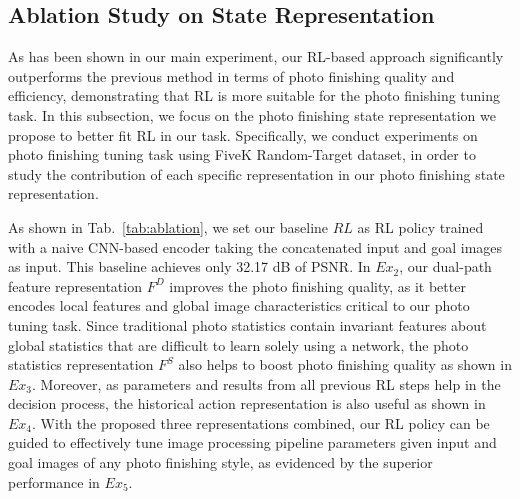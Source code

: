 \documentclass{article}
\newcommand{\pipeline}{image processing pipeline\xspace}
\newcommand{\taskPFT}{photo finishing tuning\xspace}
\begin{document}
\vspace{-5pt}
\subsection{Ablation Study on State Representation}
\label{sec:4.3}
\vspace{-7pt}
As has been shown in our main experiment, our RL-based approach significantly outperforms the previous method in terms of photo finishing quality and efficiency, demonstrating that RL is more suitable for the \taskPFT task. In this subsection, we focus on the photo finishing state representation we propose to better fit RL in our task. Specifically, we conduct experiments on \taskPFT task using FiveK Random-Target dataset, in order to study the contribution of each specific representation in our photo finishing state representation. 


As shown in Tab.~\ref{tab:ablation}, we set our baseline $RL$ as RL policy trained with a naive CNN-based encoder taking the concatenated input and goal images as input. 
This baseline achieves only 32.17 dB of PSNR. In $Ex_{2}$, our dual-path feature representation $F^D$ improves the photo finishing quality, as it better encodes local features and global image characteristics critical to our photo tuning task. 
Since traditional photo statistics contain invariant features about global statistics that are difficult to learn solely using a network, the photo statistics representation $F^S$ also helps to boost photo finishing quality as shown in $Ex_{3}$. 
Moreover, as parameters and results from all previous RL steps help in the decision process, the historical action representation is also useful as shown in $Ex_{4}$. 
With the proposed three representations combined, our RL policy can be guided to effectively tune \pipeline parameters given input and goal images of any photo finishing style, as evidenced by the superior performance in $Ex_{5}$.




\vspace{-6pt}
\end{document}
